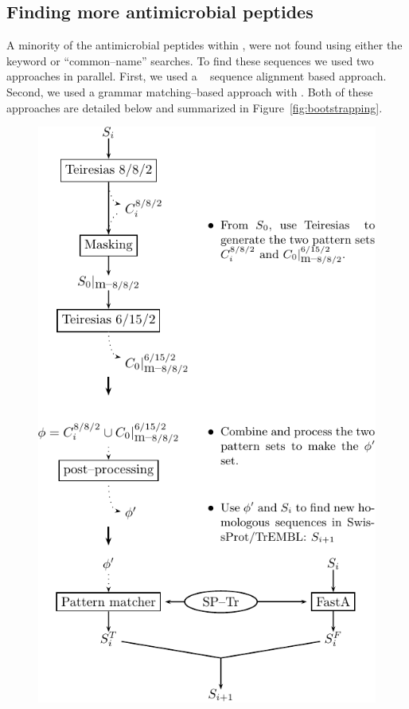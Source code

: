     \subsection{Finding more antimicrobial peptides}
        A minority of the antimicrobial peptides within \sptr, were not
        found using either the keyword or ``common--name'' searches.  To find
        these sequences we used two approaches in parallel.  First, we used
        a \Fasta~ sequence alignment based approach.  Second, we used a grammar matching--based
        approach with \Teiresias.  Both of these approaches are detailed below
        and summarized in Figure~\ref{fig:bootstrapping}.

        \begin{figure}[ptb]
        \centering
        \includegraphics{Body/Images-chap2/bootstrap.pdf}

\end{figure}
